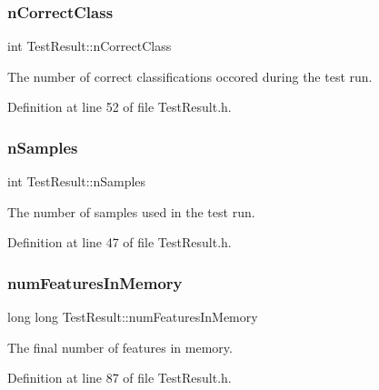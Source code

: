 \subsubsection{\texorpdfstring{n\+Correct\+Class}{nCorrectClass}}
{\footnotesize\ttfamily int Test\+Result\+::n\+Correct\+Class\hspace{0.3cm}{\ttfamily [protected]}}

The number of correct classifications occored during the test run. 

Definition at line 52 of file Test\+Result.\+h.

\mbox{\label{class_test_result_a2986ed45ae3e5dd3287804d3e35f3830}} 
\subsubsection{\texorpdfstring{n\+Samples}{nSamples}}
{\footnotesize\ttfamily int Test\+Result\+::n\+Samples\hspace{0.3cm}{\ttfamily [protected]}}

The number of samples used in the test run. 

Definition at line 47 of file Test\+Result.\+h.

\mbox{\label{class_test_result_a9d7b76c3afe61c67ffd4a73af768e9c4}} 
\subsubsection{\texorpdfstring{num\+Features\+In\+Memory}{numFeaturesInMemory}}
{\footnotesize\ttfamily long long Test\+Result\+::num\+Features\+In\+Memory\hspace{0.3cm}{\ttfamily [protected]}}

The final number of features in memory. 

Definition at line 87 of file Test\+Result.\+h.

\mbox{\label{class_test_result_ac6db89d90c92fbc19b701c3e1327dabf}} 
